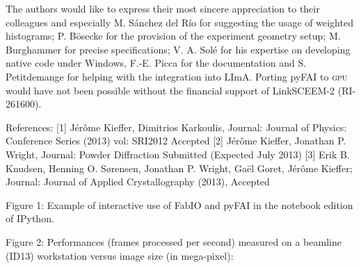 The authors would like to express their most sincere appreciation to their
colleagues and especially M. Sánchez del Río for suggesting
the usage of weighted histograms; P. Bösecke for the provision of the
experiment geometry setup; M. Burghammer for precise specifications; V. A.
Solé for his expertise on developing native code under Windows, F.-E. Picca
for the documentation and S. Petitdemange for helping with the integration into
LImA.
Porting pyFAI to \textsc{gpu} would have not been possible without the financial
support of LinkSCEEM-2 (RI-261600).

References:
[1] Jérôme Kieffer,
			Dimitrios Karkoulis,
			Journal: Journal of Physics: Conference Series (2013)
			vol: SRI2012
			Accepted
[2] 	Jérôme Kieffer,
				Jonathan P. Wright,
				Journal: Powder Diffraction 
				Submitted (Expected July 2013)				
[3] Erik B. Knudsen,
		Henning O. S{\o}rensen,
    	Jonathan P. Wright,
    	Gaël Goret,
    	Jérôme Kieffer;
    	Journal: Journal of Applied Crystallography (2013),
    	Accepted

Figure 1: Example of interactive use of FabIO and pyFAI in the notebook edition
of IPython.

Figure 2: Performances (frames processed per second) measured on a beamline
(ID13) workstation versus image size (in mega-pixel):
